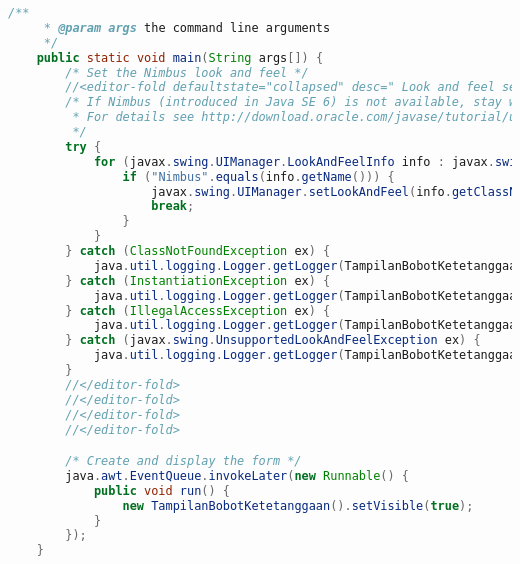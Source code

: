 \begin{lstlisting}[language=Java, caption=TampilanBobotKetetanggaan.java]
    /**
     * @param args the command line arguments
     */
    public static void main(String args[]) {
        /* Set the Nimbus look and feel */
        //<editor-fold defaultstate="collapsed" desc=" Look and feel setting code (optional) ">
        /* If Nimbus (introduced in Java SE 6) is not available, stay with the default look and feel.
         * For details see http://download.oracle.com/javase/tutorial/uiswing/lookandfeel/plaf.html 
         */
        try {
            for (javax.swing.UIManager.LookAndFeelInfo info : javax.swing.UIManager.getInstalledLookAndFeels()) {
                if ("Nimbus".equals(info.getName())) {
                    javax.swing.UIManager.setLookAndFeel(info.getClassName());
                    break;
                }
            }
        } catch (ClassNotFoundException ex) {
            java.util.logging.Logger.getLogger(TampilanBobotKetetanggaan.class.getName()).log(java.util.logging.Level.SEVERE, null, ex);
        } catch (InstantiationException ex) {
            java.util.logging.Logger.getLogger(TampilanBobotKetetanggaan.class.getName()).log(java.util.logging.Level.SEVERE, null, ex);
        } catch (IllegalAccessException ex) {
            java.util.logging.Logger.getLogger(TampilanBobotKetetanggaan.class.getName()).log(java.util.logging.Level.SEVERE, null, ex);
        } catch (javax.swing.UnsupportedLookAndFeelException ex) {
            java.util.logging.Logger.getLogger(TampilanBobotKetetanggaan.class.getName()).log(java.util.logging.Level.SEVERE, null, ex);
        }
        //</editor-fold>
        //</editor-fold>
        //</editor-fold>
        //</editor-fold>

        /* Create and display the form */
        java.awt.EventQueue.invokeLater(new Runnable() {
            public void run() {
                new TampilanBobotKetetanggaan().setVisible(true);
            }
        });
    }


\end{lstlisting}
